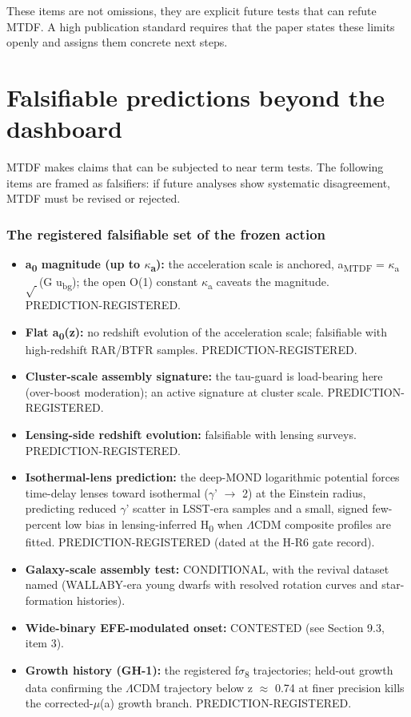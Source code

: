 \documentclass[11pt,a4paper]{article}
\begin{document}
These items are not omissions, they are explicit future tests that can refute MTDF. A high publication standard requires that the paper states these limits openly and assigns them concrete next steps.

\section{Falsifiable predictions beyond the dashboard}
\label{sec:sec9}
MTDF makes claims that can be subjected to near term tests. The following items are framed as falsifiers: if future analyses show systematic disagreement, MTDF must be revised or rejected.

\subsubsection*{The registered falsifiable set of the frozen action}
\begin{itemize}
  \item \textbf{a\textsubscript{0} magnitude (up to $\kappa$\textsubscript{a}):} the acceleration scale is anchored, a\textsubscript{MTDF} = $\kappa$\textsubscript{a}$\sqrt{\,}$(G u\textsubscript{bg}); the open O(1) constant $\kappa$\textsubscript{a} caveats the magnitude. PREDICTION-REGISTERED.
  \item \textbf{Flat a\textsubscript{0}(z):} no redshift evolution of the acceleration scale; falsifiable with high-redshift RAR/\allowbreak{}BTFR samples. PREDICTION-REGISTERED.
  \item \textbf{Cluster-scale assembly signature:} the tau-guard is load-bearing here (over-boost moderation); an active signature at cluster scale. PREDICTION-REGISTERED.
  \item \textbf{Lensing-side redshift evolution:} falsifiable with lensing surveys. PREDICTION-REGISTERED.
  \item \textbf{Isothermal-lens prediction:} the deep-MOND logarithmic potential forces time-delay lenses toward isothermal ($\gamma$' $\to$ 2) at the Einstein radius, predicting reduced $\gamma$' scatter in LSST-era samples and a small, signed few-percent low bias in lensing-inferred H\textsubscript{0} when $\Lambda$CDM composite profiles are fitted. PREDICTION-REGISTERED (dated at the H-R6 gate record).
  \item \textbf{Galaxy-scale assembly test:} CONDITIONAL, with the revival dataset named (WALLABY-era young dwarfs with resolved rotation curves and star-formation histories).
  \item \textbf{Wide-binary EFE-modulated onset:} CONTESTED (see Section 9.3, item 3).
  \item \textbf{Growth history (GH-1):} the registered f$\sigma$\textsubscript{8} trajectories; held-out growth data confirming the $\Lambda$CDM trajectory below z $\approx$ 0.74 at finer precision kills the corrected-$\mu$(a) growth branch. PREDICTION-REGISTERED.
\end{itemize}
\end{document}
